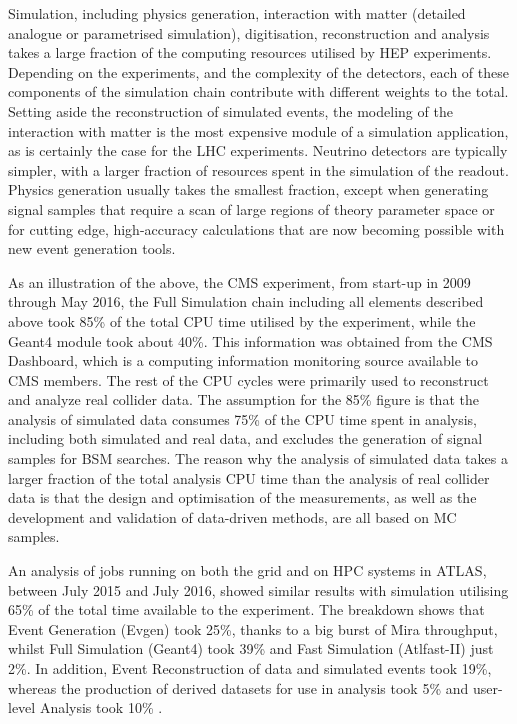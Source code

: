 \documentclass[12pt,a4paper]{article}
\begin{document}
{Simulation, including physics generation, interaction with matter
(detailed analogue or parametrised simulation), digitisation,
reconstruction and analysis takes a large fraction of the computing
resources utilised by HEP experiments. Depending on the experiments, and
the complexity of the detectors, each of these components of the
simulation chain contribute with different weights to the total. Setting
aside the reconstruction of simulated events, the modeling of the
interaction with matter is the most expensive module of a simulation
application, as is certainly the case for the LHC experiments. Neutrino
detectors are typically simpler, with a larger fraction of resources
spent in the simulation of the readout. Physics generation usually takes
the smallest fraction, except when generating signal samples that
require a scan of large regions of theory parameter space or for cutting
edge, high-accuracy calculations that are now becoming possible with new
event generation tools.

As an illustration of the above, the CMS experiment, from start-up in
2009 through May 2016, the Full Simulation chain including all elements
described above took 85\% of the total CPU time utilised by the
experiment, while the Geant4 module took about 40\%. This information
was obtained from the CMS Dashboard, which is a computing information
monitoring source available to CMS members. The rest of the CPU cycles
were primarily used to reconstruct and analyze real collider data. The
assumption for the 85\% figure is that the analysis of simulated data
consumes 75\% of the CPU time spent in analysis, including both
simulated and real data, and excludes the generation of signal samples
for BSM searches. The reason why the analysis of simulated data takes a
larger fraction of the total analysis CPU time than the analysis of real
collider data is that the design and optimisation of the measurements,
as well as the development and validation of data-driven methods, are
all based on MC samples.

An analysis of jobs running on both the grid and on HPC systems in
ATLAS, between July 2015 and July 2016, showed similar results with
simulation utilising 65\% of the total time available to the experiment.
The breakdown shows that Event Generation (Evgen) took 25\%, thanks to a
big burst of Mira throughput, whilst Full Simulation (Geant4) took 39\%
and Fast Simulation (Atlfast-II) just 2\%. In addition, Event
Reconstruction of data and simulated events took 19\%, whereas the
production of derived datasets for use in analysis took 5\% and
user-level Analysis took 10\% .

}
\end{document}
